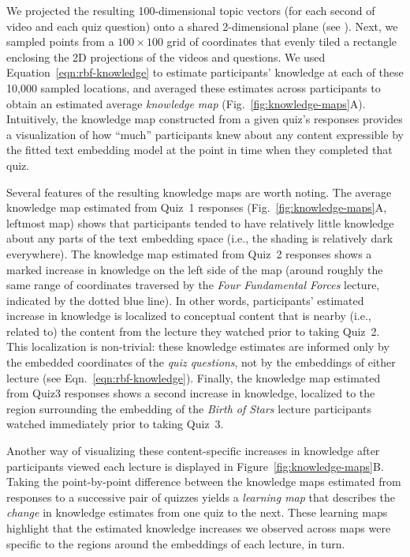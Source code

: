 \documentclass[10pt]{article}
\renewcommand{\nameref}[1]{\mbox{\textit{\oldnameref{#1}}}}
\providecommand{\DIFaddtex}[1]{{\protect\color{blue}\uwave{#1}}} %
\providecommand{\DIFaddbegin}{} %
\providecommand{\DIFaddend}{} %
\providecommand{\DIFadd}[1]{\texorpdfstring{\DIFaddtex{#1}}{#1}} %
\newcommand{\DIFaddincludegraphics}[2][]{{\color{blue}\fbox{\DIFOincludegraphics[#1]{#2}}}} %
\DeclareRobustCommand{\DIFaddbegin}{\DIFOaddbegin \let\includegraphics\DIFaddincludegraphics} %
\DeclareRobustCommand{\DIFaddend}{\DIFOaddend \let\includegraphics\DIFOincludegraphics} %
\begin{document}
We projected the resulting 100-dimensional topic vectors (for each second of
video and each quiz question) onto a shared 2-dimensional plane (see
\nameref{subsec:knowledge-maps}). Next, we sampled points from a $100 \times
100$ grid of coordinates that evenly tiled a rectangle enclosing the 2D
projections of the videos and questions. We used
Equation~\ref{eqn:rbf-knowledge} to estimate participants' knowledge at each of
these 10,000 sampled locations, and averaged these estimates across
participants to obtain an estimated average \textit{knowledge map}
(Fig.~\ref{fig:knowledge-maps}A). Intuitively, the knowledge map constructed
from a given quiz's responses provides a visualization of how ``much''
participants knew about any content expressible by the fitted text embedding
model at the point in time when they completed that quiz.

Several features of the resulting knowledge maps are worth noting. The average
knowledge map estimated from Quiz~1 responses (Fig.~\ref{fig:knowledge-maps}A,
leftmost map) shows that participants tended to have relatively little
knowledge about any parts of the text embedding space (i.e., the shading is
relatively dark everywhere). The knowledge map estimated from Quiz~2 responses
shows a marked increase in knowledge on the left side of the map (around
roughly the same range of coordinates traversed by the \textit{Four Fundamental
Forces} lecture, indicated by the dotted blue line). In other words,
participants' estimated increase in knowledge is localized to conceptual
content that is nearby (i.e., related to) the content from the lecture they
watched prior to taking Quiz~2. This localization is non-trivial: these
knowledge estimates are informed only by the embedded coordinates of the
\textit{quiz questions}, not by the embeddings of either lecture (see
Eqn.~\ref{eqn:rbf-knowledge}). Finally, the knowledge map estimated from Quiz\DIFaddbegin \DIFadd{~}\DIFaddend 3
responses shows a second increase in knowledge, localized to the region
surrounding the embedding of the \textit{Birth of Stars} lecture participants
watched immediately prior to taking Quiz~3.

Another way of visualizing these content-specific increases in knowledge after
participants viewed each lecture is displayed in
Figure~\ref{fig:knowledge-maps}B. Taking the point-by-point difference between
the knowledge maps estimated from responses to a successive pair of quizzes
yields a \textit{learning map} that describes the \textit{change} in knowledge
estimates from one quiz to the next. These learning maps highlight that the
estimated knowledge increases we observed across maps were specific to the
regions around the embeddings of each lecture, in turn.
\end{document}
